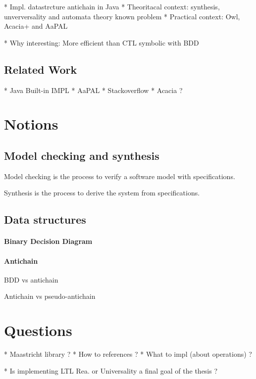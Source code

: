 \documentclass[letterpaper]{article}
\begin{document}
* Impl. datastrcture antichain in Java
* Theoritacal context: synthesis,
unverversality and automata theory known problem
* Practical context: Owl, Acacia+ and AaPAL

* Why interesting: More efficient than CTL symbolic with BDD

\subsection{Related Work}

* Java Built-in IMPL
* AaPAL
* Stackoverflow
* Acacia ?

\section{Notions}

\subsection{Model checking and synthesis}

Model checking is the process to verify a software model with
specifications.

Synthesis is the process to derive the system from specifications.

\cite{bohyphd}

\cite{ltl_rea}
\subsection{Data structures}

\paragraph{Binary Decision Diagram}

\paragraph{Antichain}

BDD vs antichain

Antichain vs pseudo-antichain

\section{Questions}

* Maastricht library ? \cite{acacia} \cite{aapal}
* How to references ?
* What to impl (about operations) ?

* Is implementing LTL Rea. or Universality a final goal of the thesis ?



\end{document}
